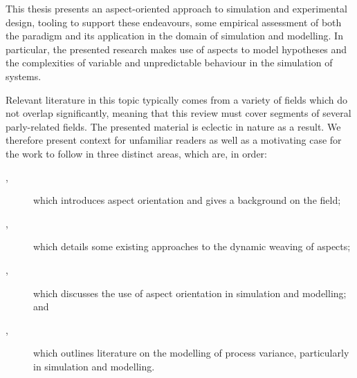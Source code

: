 %
%



This thesis presents an aspect-oriented approach to simulation and experimental
design, tooling to support these endeavours, some empirical assessment of both
the paradigm and its application in the domain of simulation and modelling. In
particular, the presented research makes use of aspects to model hypotheses and
the complexities of variable and unpredictable behaviour in the simulation of
\sociotechnical systems.

Relevant literature in this topic typically comes from a variety of fields which
do not overlap significantly, meaning that this review must cover segments of
several parly-related fields. The presented material is eclectic in nature as a
result. We therefore present context for unfamiliar readers as well as a
motivating case for the work to follow in three distinct areas, which are, in
order:

\begin{description}

    \item[,] which introduces aspect orientation and
    gives a background on the field;
    \item[,] which details some existing approaches
    to the dynamic weaving of aspects;
    \item[,] which discusses the use of aspect
    orientation in simulation and modelling; and
    \item[,] which outlines literature on the modelling
    of process variance, particularly in simulation and modelling.

\end{description}


